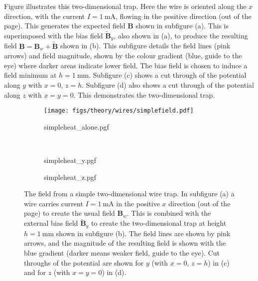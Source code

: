 Figure  illustrates this two-dimensional trap.
Here the wire is oriented along the $x$ direction, with the current
$I=\SI{1}{\milli\ampere}$, flowing in the
positive direction (out of the page). This generates the expected field
$\mathbf{B}$ shown in subfigure (a). This is superimposed with the bias field
$\mathbf{\tilde{B}}_y$, also shown in (a), to produce the resulting field
$\mathbf{B} = \mathbf{B}_w + \mathbf{\tilde{B}}$ shown
in (b). This subfigure details the field lines (pink arrows) and field
magnitude, shown by the colour gradient
(blue, guide to the eye) where darker areas indicate lower field. The bias field
is chosen to induce a field minimum at $h=\SI{1}{\milli\meter}$. Subfigure (c)
shows a cut through of the potential along $y$ with $x=0$, $z=h$. Subfigure (d)
also shows a cut through of the potential along $z$ with $x=y=0$. This
demonstrates the two-dimensional trap.

\begin{figure}[htbp]
  \centering
  \begin{subfigure}[b]{0.45\textwidth}
    \centering
    \hfill{}
    \texttt{[image: figs/theory/wires/simplefield.pdf]}
    \hfill{}
  \end{subfigure}
  \begin{subfigure}[b]{0.45\textwidth}
    \centering
    {simpleheat_alone.pgf}
  \end{subfigure} \\
  \begin{subfigure}[b]{0.45\textwidth}
    \centering
    {simpleheat_y.pgf}
  \end{subfigure}
  \begin{subfigure}[b]{0.45\textwidth}
    \centering
    {simpleheat_z.pgf}
  \end{subfigure}
  \caption{
    The field from a simple two-dimensional wire trap. In subfigure (a) a wire carries
    current $I=\SI{1}{\milli\ampere}$ in the positive $x$ direction (out of the
    page) to create the usual field $\mathbf{B}_w$. This is combined with the
    external bias field $\mathbf{\tilde{B}}_y$ to create the two-dimensional trap
    at height $h=\SI{1}{\milli\meter}$
    shown in subfigure (b). The field lines are shown by pink arrows, and the
    magnitude of the resulting field is shown with the blue gradient (darker
    means weaker field, guide to the eye). Cut throughs of the potential are
    shown for $y$ (with $x=0$, $z=h$) in (c) and for $z$ (with $x = y = 0$) in
    (d).
  }
  \label{theory:fig:simplefield}
\end{figure}


